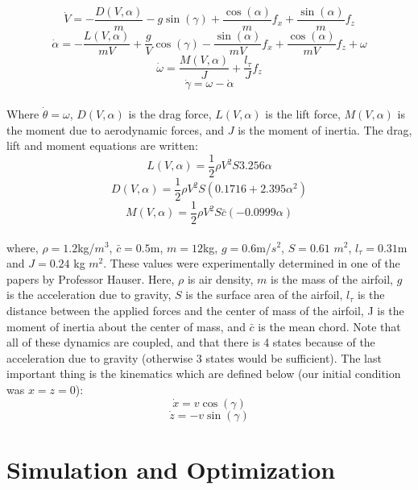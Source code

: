\documentclass[journal]{IEEEtran}
\begin{document}
\[\dot{V}=-\frac{D(V,\alpha)}{m}-g\sin(\gamma)+\frac{\cos(\alpha)}{m}f_x+\frac{\sin(\alpha)}{m}f_z\]
\[\dot{\alpha}=-\frac{L(V,\alpha)}{mV}+\frac{g}{V}\cos(\gamma)-\frac{\sin(\alpha)}{mV}f_x+\frac{\cos(\alpha)}{mV}f_z+\omega\]
\[\dot{\omega}=\frac{M(V,\alpha)}{J}+\frac{l_{\tau}}{J}f_z\]
\[\dot{\gamma}=\omega-\dot{\alpha}\]\\
\indent Where $\dot{\theta}=\omega$, $D(V,\alpha)$ is the drag force, $L(V,\alpha)$ is the lift force, $M(V,\alpha)$ is the moment due to aerodynamic forces, and $J$ is the moment of inertia. The drag, lift and moment equations are written:
\[L(V,\alpha)=\frac{1}{2}\rho V^2S3.256\alpha\]
\[D(V,\alpha)=\frac{1}{2}\rho V^2S(0.1716+2.395\alpha^2)\]
\[M(V,\alpha)=\frac{1}{2}\rho V^2S\bar{c}(-0.0999\alpha)\]
\\
\indent where, $\rho=1.2$kg/$m^3$, $\bar{c}=0.5$m, $m=12$kg, $g=0.6$m/$s^2$, $S=0.61$ $m^2$, $l_\tau=0.31$m and $J=0.24$ kg $m^2$. These values were experimentally determined in one of the papers by Professor Hauser\cite{Jadbabaie}. Here, $\rho$ is air density, $m$ is the mass of the airfoil, $g$ is the acceleration due to gravity, $S$ is the surface area of the airfoil, $l_\tau$ is the distance between the applied forces and the center of mass of the airfoil, J is the moment of inertia
about the center of mass, and $\bar{c}$ is the mean chord. Note that all of these dynamics are coupled, and that there is 4 states because of the acceleration due to gravity (otherwise 3 states would be sufficient). The last important thing is the kinematics which are defined below (our initial condition was $x=z=0$):
\[\dot{x}=v\cos(\gamma)\]
\[\dot{z}=-v\sin(\gamma)\]
\section{Simulation and Optimization}
\end{document}

